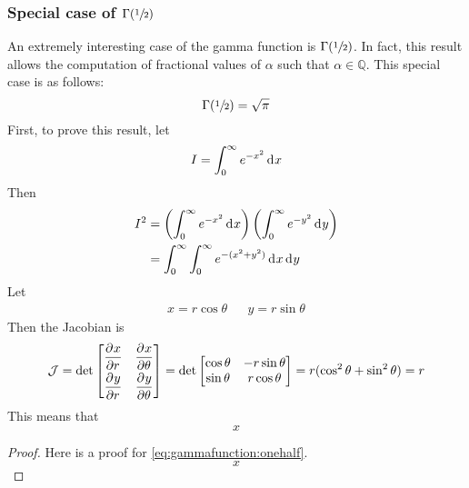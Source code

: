 \documentclass[12pt]{article}
\newcommand{\J}{\mathcal{J}}
\begin{document}
\pagebreak
\subsubsection{Special case of $\Gamma(\sfrac{1}{2})$ }
An extremely interesting case of the gamma function is $\Gamma(\sfrac{1}{2})$. In fact, this result allows the
computation of fractional values of $\alpha$ such that $\alpha\in\mathbb{Q}$. This special case is as follows:
\begin{equation}\label{eq:gammafunction:onehalf}
	\Gamma(\sfrac{1}{2})=\sqrt{\pi}
\end{equation}
First, to prove this result, let
\begin{equation*}
	I = \int^\infty_0 e^{-x^2}\mathop{}\!\mathrm{d^{}}x
\end{equation*}
Then
\begin{equation*}
	\begin{split}
		I^2	&=	\left(\int^\infty_0 e^{-x^2}\mathop{}\!\mathrm{d^{}}x\right)\left(\int^\infty_0 e^{-y^2}\mathop{}\!\mathrm{d^{}}y\right)\\
			&=	\int^\infty_0\int^\infty_0 e^{-(x^2+y^2)}\mathop{}\!\mathrm{d^{}}x\mathop{}\!\mathrm{d^{}}y
	\end{split}
\end{equation*}
Let
\begin{align}
	x=r\cos\theta	&&	y=r\sin\theta
\end{align}
Then the Jacobian is
\begin{equation*}
	\J = \det\begin{bmatrix}
		\pderiv{x}{r}	&	\pderiv{x}{\theta}\\[6pt]
		\pderiv{y}{r}	&	\pderiv{y}{\theta}
		\end{bmatrix} = \det\begin{bmatrix}
			\cos\theta	&	-r\sin\theta\\
			\sin\theta	&	r\cos\theta
		\end{bmatrix} = r(\cos^2\theta + \sin^2\theta) = r
\end{equation*}
This means that
\begin{equation*}
	x
\end{equation*}
\begin{proof}
	Here is a proof for \autoref{eq:gammafunction:onehalf}.
	\begin{equation*}
		x
	\end{equation*}
\end{proof}

\end{document}
